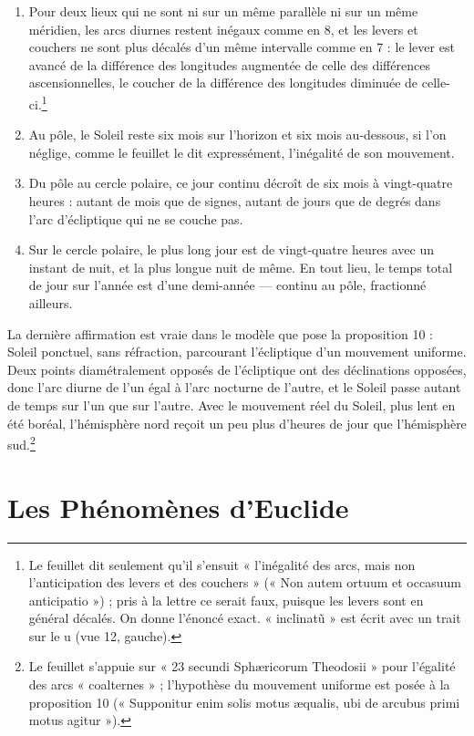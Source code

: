 \documentclass[11pt,a4paper]{article}
\begin{document}
\begin{enumerate}
    déclinaison sud, c'est l'inverse.
  \item[9.] Pour deux lieux qui ne sont ni sur un même parallèle ni sur un même
    méridien, les arcs diurnes restent inégaux comme en 8, et les levers et
    couchers ne sont plus décalés d'un même intervalle comme en 7 : le lever
    est avancé de la différence des longitudes augmentée de celle des
    différences ascensionnelles, le coucher de la différence des longitudes
    diminuée de celle-ci.\footnote{Le feuillet dit seulement qu'il s'ensuit
    « l'inégalité des arcs, mais non l'anticipation des levers et des couchers »
    (« Non autem ortuum et occasuum anticipatio ») ; pris à la lettre ce serait
    faux, puisque les levers sont en général décalés. On donne l'énoncé exact.
    « inclinatũ » est écrit avec un trait sur le u (vue 12, gauche).}
  \item[10.] Au pôle, le Soleil reste six mois sur l'horizon et six mois
    au-dessous, si l'on néglige, comme le feuillet le dit expressément,
    l'inégalité de son mouvement.
  \item[11.] Du pôle au cercle polaire, ce jour continu décroît de six mois à
    vingt-quatre heures : autant de mois que de signes, autant de jours que de
    degrés dans l'arc d'écliptique qui ne se couche pas.
  \item[12.] Sur le cercle polaire, le plus long jour est de vingt-quatre heures
    avec un instant de nuit, et la plus longue nuit de même. En tout lieu, le
    temps total de jour sur l'année est d'une demi-année — continu au pôle,
    fractionné ailleurs.
\end{enumerate}

La dernière affirmation est vraie dans le modèle que pose la proposition 10 :
Soleil ponctuel, sans réfraction, parcourant l'écliptique d'un mouvement
uniforme. Deux points diamétralement opposés de l'écliptique ont des
déclinations opposées, donc l'arc diurne de l'un égal à l'arc nocturne de
l'autre, et le Soleil passe autant de temps sur l'un que sur l'autre. Avec le
mouvement réel du Soleil, plus lent en été boréal, l'hémisphère nord reçoit un
peu plus d'heures de jour que l'hémisphère sud.\footnote{Le feuillet s'appuie sur
« 23 secundi Sphæricorum Theodosii » pour l'égalité des arcs « coalternes » ;
l'hypothèse du mouvement uniforme est posée à la proposition 10 (« Supponitur
enim solis motus æqualis, ubi de arcubus primi motus agitur »).}

\section*{Les Phénomènes d'Euclide}
\end{document}
